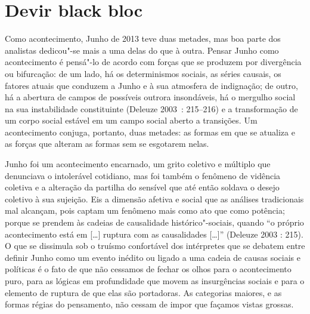 \chapter{Devir black bloc}


Como acontecimento, Junho de 2013 teve duas metades, mas boa parte dos
analistas dedicou"-se mais a uma delas do que à outra. Pensar Junho como
acontecimento é pensá"-lo de acordo com forças que se produzem por
divergência ou bifurcação: de um lado, há os determinismos sociais, as
séries causais, os fatores atuais que conduzem a Junho e à sua atmosfera
de indignação; de outro, há a abertura de campos de possíveis outrora
insondáveis, há o mergulho social na sua instabilidade constituinte
(Deleuze 2003~: 215--216) e a transformação de um corpo social estável em
um campo social aberto a transições. Um acontecimento conjuga, portanto,
duas metades: as formas em que se atualiza e as forças que alteram as
formas sem se esgotarem nelas.

Junho foi um acontecimento encarnado, um grito coletivo e múltiplo que
denunciava o intolerável cotidiano, mas foi também o fenômeno de
vidência coletiva e a alteração da partilha do sensível que até então
soldava o desejo coletivo à sua sujeição. Eis a dimensão afetiva e
social que as análises tradicionais mal alcançam, pois captam um
fenômeno mais como ato que como potência; porque se prendem às cadeias
de causalidade histórico"-sociais, quando ``o próprio acontecimento está
em {[}\ldots{}{]} ruptura com as causalidades {[}\ldots{}{]}'' (Deleuze 2003
: 215). O que se dissimula sob o truísmo confortável dos intérpretes que
se debatem entre definir Junho como um evento inédito ou ligado a uma
cadeia de causas sociais e políticas é o fato de que não cessamos de
fechar os olhos para o acontecimento puro, para as lógicas em
profundidade que movem as insurgências sociais e para o elemento de
ruptura de que elas são portadoras. As categorias maiores, e as formas
régias do pensamento, não cessam de impor que façamos vistas grossas.

